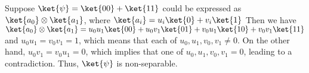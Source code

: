 \par Suppose $\ket{\psi} = \ket{00} + \ket{11}$ could be expressed as $\ket{a_0}
\otimes \ket{a_1}$, where $\ket{a_i} = u_i \ket{0} + v_i \ket{1}$ Then we have
$\ket{a_0} \otimes \ket{a_1} = u_0 u_1 \ket{00} + u_0 v_1 \ket{01} + v_0 u_1
\ket{10} + v_0 v_1 \ket{11}$ and $u_0 u_1 = v_0 v_1 = 1$, which means that each
of $u_0, u_1, v_0, v_1 \ne 0$. On the other hand, $u_0 v_1 = v_0 u_1 = 0$, which
implies that one of $u_0, u_1, v_0, v_1 = 0$, leading to a contradiction. Thus,
$\ket{\psi}$ is non-separable.
